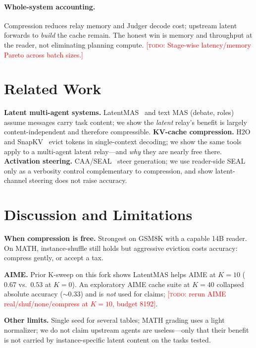 \documentclass[11pt]{article}
\newcommand{\todo}[1]{\textcolor{red}{[\textsc{todo}: #1]}}
\begin{document}
\paragraph{Whole-system accounting.}
Compression reduces relay memory and Judger decode cost; upstream latent
forwards to \emph{build} the cache remain. The honest win is memory and
throughput at the reader, not eliminating planning compute.
\todo{Stage-wise latency/memory Pareto across batch sizes.}

\section{Related Work}
\textbf{Latent multi-agent systems.} LatentMAS~\cite{latentmas} and text MAS
(debate, roles)~\cite{du2023debate} assume messages carry task content; we show
the \emph{latent} relay's benefit is largely content-independent and therefore
compressible.
\textbf{KV-cache compression.} H2O and SnapKV~\cite{h2o,snapkv} evict tokens in
single-context decoding; we show the same tools apply to a multi-agent latent
relay---and \emph{why} they are nearly free there.
\textbf{Activation steering.} CAA/SEAL~\cite{caa,seal} steer generation; we use
reader-side SEAL only as a verbosity control complementary to compression, and
show latent-channel steering does not raise accuracy.

\section{Discussion and Limitations}
\label{sec:limits}
\textbf{When compression is free.} Strongest on GSM8K with a capable 14B reader.
On MATH, instance-shuffle still holds but aggressive eviction costs accuracy:
compress gently, or accept a tax.

\textbf{AIME.} Prior K-sweep on this fork shows LatentMAS helps AIME at $K{=}10$
($0.67$ vs.\ $0.53$ at $K{=}0$). An exploratory AIME cache suite at $K{=}40$
collapsed absolute accuracy ($\sim$0.33) and is \emph{not} used for claims;
\todo{rerun AIME real/shuf/none/compress at $K{=}10$, budget 8192}.

\textbf{Other limits.} Single seed for several tables; MATH grading uses a light
normalizer; we do not claim upstream agents are useless---only that their benefit
is not carried by instance-specific latent content on the tasks tested.
\end{document}
